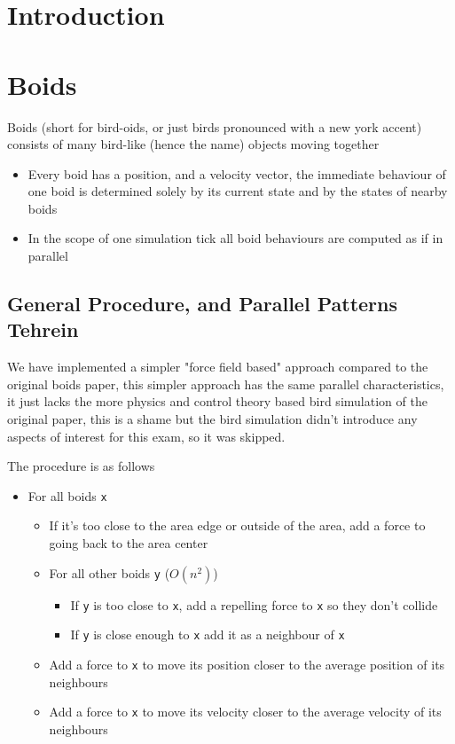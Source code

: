 \documentclass[11pt]{article}
\author{Dickie Smalls}
\date{\today}
\title{}
\begin{document}
\tableofcontents

\section{Introduction}
\label{sec:org8f7b774}
\section{Boids}
\label{sec:orgd29aa5e}
Boids (short for bird-oids, or just birds pronounced with a new york accent) consists of many bird-like (hence the name) objects moving together
\begin{itemize}
\item Every boid has a position, and a velocity vector, the immediate behaviour of one boid is determined solely by its current state and by the states of nearby boids
\item In the scope of one simulation tick all boid behaviours are computed as if in parallel
\end{itemize}
\subsection{General Procedure, and Parallel Patterns Tehrein}
\label{sec:org0d749a0}
We have implemented a simpler "force field based" approach compared to the original boids paper, this simpler approach has the same parallel characteristics, it just lacks the more physics and control theory based bird simulation of the original paper, this is a shame but the bird simulation didn't introduce any aspects of interest for this exam, so it was skipped.

The procedure is as follows
\begin{itemize}
\item For all boids \texttt{x}
\begin{itemize}
\item If it's too close to the area edge or outside of the area, add a force to going back to the area center
\item For all other boids \texttt{y} (\(O(n^2)\))
\begin{itemize}
\item If \texttt{y} is too close to \texttt{x}, add a repelling force to \texttt{x} so they don't collide
\item If \texttt{y} is close enough to \texttt{x} add it as a neighbour of \texttt{x}
\end{itemize}
\item Add a force to \texttt{x} to move its position closer to the average position of its neighbours
\item Add a force to \texttt{x} to move its velocity closer to the average velocity of its neighbours
\end{itemize}
\end{itemize}
\end{document}
